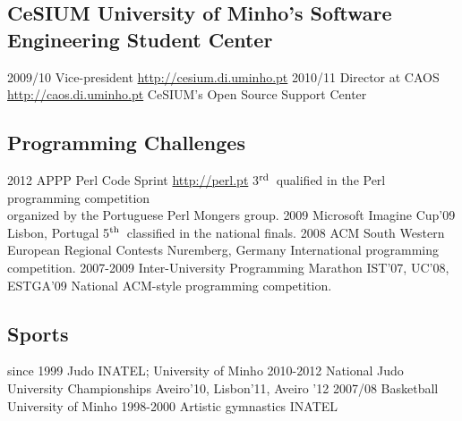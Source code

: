 \documentclass[a4paper]{friggeri-cv}
\begin{document}
\subsection{CeSIUM {\normalfont\small University of Minho's Software Engineering Student Center}}{}
\begin{entrylist}
  \entry
    {2009/10}
    {Vice-president}
    {\href{http://cesium.di.uminho.pt}{http://cesium.di.uminho.pt}}
    {\vspace{-.8cm}}
  \entry
    {2010/11}
    {Director at CAOS}
    {\href{http://caos.di.uminho.pt}{http://caos.di.uminho.pt}}
    {CeSIUM's Open Source Support Center}
\end{entrylist}

\subsection{Programming Challenges}{}
\begin{entrylist}
  \entry
    {2012}
    {APPP Perl Code Sprint}
	{\href{http://perl.pt}{http://perl.pt}}
    {3$^{\footnotesize\textrm{rd}}$~qualified in the Perl programming competition\\organized by the Portuguese Perl Mongers group.}
  \entry
    {2009}
    {Microsoft Imagine Cup'09}
	{Lisbon, Portugal}
    {5$^{\footnotesize\textrm{th}}$~classified in the national finals.}
  \entry
    {2008}
    {ACM South Western European Regional Contests}
	{Nuremberg, Germany}
    {International programming competition.}
  \entry
    {2007-2009}
    {Inter-University Programming Marathon}
	{IST'07, UC'08, ESTGA'09}
    {National ACM-style programming competition.}
\end{entrylist}

\subsection{Sports}{}
\begin{entrylist}
  \entry
    {{\footnotesize since} 1999}
    {Judo}
    {INATEL; University of Minho}
    {\vspace{-.8cm}}
  \entry
    {2010-2012}
    {National Judo University Championships}
    {Aveiro'10, Lisbon'11, Aveiro '12}
    {\vspace{-.8cm}}
  \entry
    {2007/08}
    {Basketball}
    {University of Minho}
    {\vspace{-.8cm}}
  \entry
    {1998-2000}
    {Artistic gymnastics}
    {INATEL}
    {}
\end{entrylist}
\end{document}
